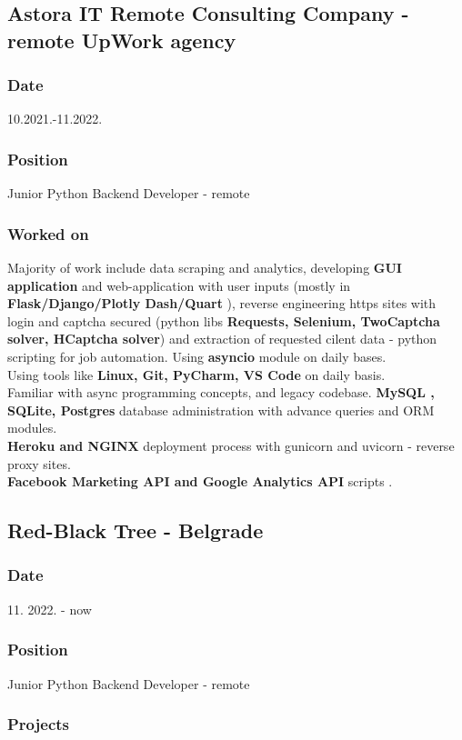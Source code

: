 \documentclass[10pt]{article}
\begin{document}
\subsection{\large{Astora IT Remote Consulting Company - remote UpWork agency}}
\subsubsection{Date}
10.2021.-11.2022.
\subsubsection{Position}
Junior Python Backend Developer - remote
\subsubsection{Worked on}
Majority of work include data scraping and analytics, developing \textbf{GUI application} and web-application with user inputs (mostly in \textbf{ Flask/Django/Plotly Dash/Quart} ), reverse engineering
https sites with login and captcha secured (python libs \textbf{Requests, Selenium, TwoCaptcha solver, HCaptcha solver}) and extraction of requested cilent data - python scripting for job automation. Using \textbf{asyncio} module on daily bases.
\\ Using tools like \textbf{Linux, Git,  PyCharm, VS Code} on daily basis.  \\
Familiar with async programming concepts, and legacy codebase.
\textbf{MySQL , SQLite,  Postgres} database administration with advance queries and ORM modules.\\
\textbf{Heroku and NGINX} deployment process with gunicorn and uvicorn - reverse proxy sites.\\
\textbf{Facebook Marketing API and Google Analytics API} scripts .\\

\subsection{\large{Red-Black Tree - Belgrade}}
\subsubsection{Date}
11. 2022. -  now
\subsubsection{Position}
Junior Python Backend Developer - remote
\subsubsection{Projects}
\end{document}
